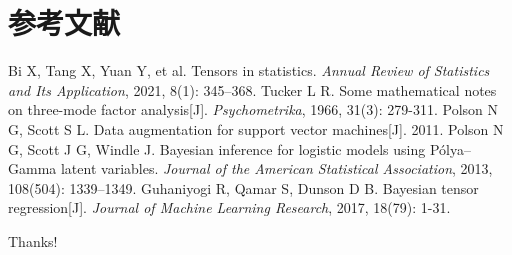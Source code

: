 \documentclass{beamer}
\begin{document}
	\section{参考文献}
	
	\begin{frame}[allowframebreaks]
		\begin{thebibliography}{99}
			Bi X, Tang X, Yuan Y, et al. Tensors in statistics. \textit{Annual Review of Statistics and Its Application}, 2021, 8(1): 345–368.
			Tucker L R. Some mathematical notes on three-mode factor analysis[J]. \textit{Psychometrika}, 1966, 31(3): 279-311.
			Polson N G, Scott S L. Data augmentation for support vector machines[J]. 2011.
			Polson N G, Scott J G, Windle J. Bayesian inference for logistic models using Pólya–Gamma latent variables. \textit{Journal of the American Statistical Association}, 2013, 108(504): 1339–1349.
			Guhaniyogi R, Qamar S, Dunson D B. Bayesian tensor regression[J]. \textit{Journal of Machine Learning Research}, 2017, 18(79): 1-31.
		\end{thebibliography}
	\end{frame}
	
	\begin{frame}
		\begin{center}
			{\Huge\calligra Thanks!}
		\end{center}
	\end{frame}
	
\end{document}
